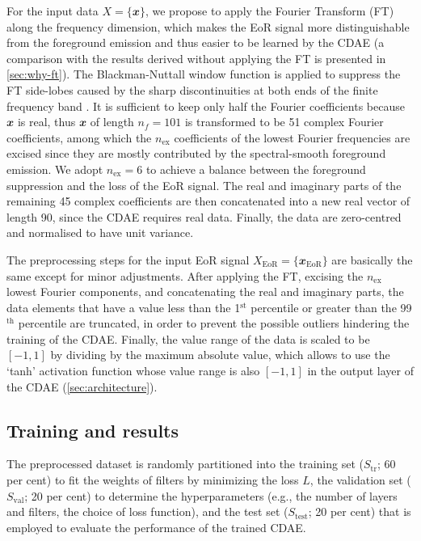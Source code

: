 \documentclass[fleqn,usenatbib]{mnras}
\newcommand{\R}[1]{\mathrm{#1}}
\newcommand{\B}[1]{\mathbfit{#1}}
\begin{document}
For the input data $X = \{\B{x}\}$, we propose to apply the
Fourier Transform (FT) along the frequency dimension,
which makes the EoR signal more distinguishable from the
foreground emission and thus easier to be learned by the CDAE
(a comparison with the results derived without applying the FT is
presented in \autoref{sec:why-ft}).
The Blackman-Nuttall window function is applied to suppress the
FT side-lobes caused by the sharp discontinuities at both ends
of the finite frequency band \citep[e.g.,][]{chapman2016}.
It is sufficient to keep only half the Fourier coefficients because
$\B{x}$ is real, thus $\B{x}$ of length $n_f = 101$ is transformed to
be 51 complex Fourier coefficients, among which the $n_{\R{ex}}$
coefficients of the lowest Fourier frequencies are excised since they
are mostly contributed by the spectral-smooth foreground emission.
We adopt $n_{\R{ex}} = 6$ to achieve a balance between the foreground
suppression and the loss of the EoR signal.
The real and imaginary parts of the remaining 45 complex coefficients
are then concatenated into a new real vector of length 90, since the CDAE
requires real data.
Finally, the data are zero-centred and normalised to have unit variance.

The preprocessing steps for the input EoR signal
$X_{\R{EoR}} = \{\B{x}_{\R{EoR}}\}$
are basically the same except for minor adjustments.
After applying the FT, excising the $n_{\R{ex}}$ lowest Fourier
components, and concatenating the real and imaginary parts,
the data elements that have a value less than the 1$^{\R{st}}$
percentile or greater than the 99$^{\R{th}}$ percentile are truncated,
in order to prevent the possible outliers hindering the training of
the CDAE.
Finally, the value range of the data is scaled to be $[-1, 1]$ by
dividing by the maximum absolute value,
which allows to use the `tanh' activation function whose value range
is also $[-1, 1]$ in the output layer of the CDAE
(\autoref{sec:architecture}).


\subsection{Training and results}
\label{sec:training}

The preprocessed dataset is randomly partitioned into
the training set ($S_{\R{tr}}$; 60 per cent) to fit the weights of
filters by minimizing the loss $L$,
the validation set ($S_{\R{val}}$; 20 per cent) to determine the
hyperparameters (e.g., the number of layers and filters, the choice of
loss function),
and the test set ($S_{\R{test}}$; 20 per cent) that is employed to
evaluate the performance of the trained CDAE.
\end{document}
